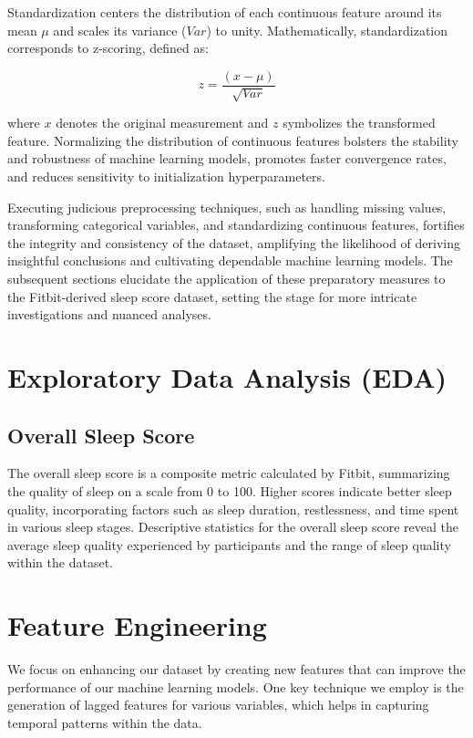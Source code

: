 \documentclass[10pt]{extarticle}
\begin{document}
Standardization centers the distribution of each continuous feature around its mean \(\mu{}\) and scales its variance (\(Var\)) to unity. Mathematically, standardization corresponds to z-scoring, defined as:

\[
z = \frac{(x - \mu)}{\sqrt{Var}}
\]

where \(x\) denotes the original measurement and \(z\) symbolizes the transformed feature. Normalizing the distribution of continuous features bolsters the stability and robustness of machine learning models, promotes faster convergence rates, and reduces sensitivity to initialization hyperparameters.

Executing judicious preprocessing techniques, such as handling missing values, transforming categorical variables, and standardizing continuous features, fortifies the integrity and consistency of the dataset, amplifying the likelihood of deriving insightful conclusions and cultivating dependable machine learning models. The subsequent sections elucidate the application of these preparatory measures to the Fitbit-derived sleep score dataset, setting the stage for more intricate investigations and nuanced analyses.

\section{Exploratory Data Analysis (EDA)}

\subsection{Overall Sleep Score}

The overall sleep score is a composite metric calculated by Fitbit, summarizing the quality of sleep on a scale from 0 to 100. Higher scores indicate better sleep quality, incorporating factors such as sleep duration, restlessness, and time spent in various sleep stages. Descriptive statistics for the overall sleep score reveal the average sleep quality experienced by participants and the range of sleep quality within the dataset.

\section{Feature Engineering}

We focus on enhancing our dataset by creating new features that can improve the performance of our machine learning models. One key technique we employ is the generation of lagged features for various variables, which helps in capturing temporal patterns within the data.
\end{document}
